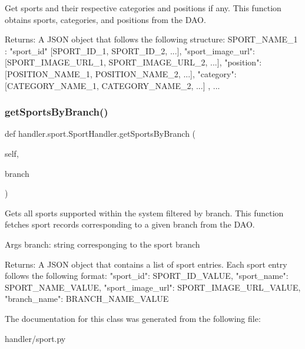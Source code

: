 \begin{DoxyVerb}Get sports and their respective categories and positions if any.
This function obtains sports, categories, and positions from the DAO.

Returns:
    A JSON object that follows the following structure:
{
    SPORT_NAME_1 : 
    {
        "sport_id" [SPORT_ID_1, SPORT_ID_2, ...],
        "sport_image_url": [SPORT_IMAGE_URL_1, SPORT_IMAGE_URL_2, ...],
        "position": [POSITION_NAME_1, POSITION_NAME_2, ...],
        "category": [CATEGORY_NAME_1, CATEGORY_NAME_2, ...]
    },
    ...
}
\end{DoxyVerb}
 \mbox{\label{classhandler_1_1sport_1_1_sport_handler_a5cd67d66c4b722c46da490fe63beff74}} 
\subsubsection{\texorpdfstring{get\+Sports\+By\+Branch()}{getSportsByBranch()}}
{\footnotesize\ttfamily def handler.\+sport.\+Sport\+Handler.\+get\+Sports\+By\+Branch (\begin{DoxyParamCaption}\item[{}]{self,  }\item[{}]{branch }\end{DoxyParamCaption})}

\begin{DoxyVerb}Gets all sports supported within the system filtered by branch.
This function fetches sport records corresponding to a given branch from the DAO.

Args
    branch: string corresponging to the sport branch

Returns:
    A JSON object that contains a list of sport entries.
    Each sport entry follows the following format:
{
    "sport_id": SPORT_ID_VALUE,
    "sport_name": SPORT_NAME_VALUE,
    "sport_image_url": SPORT_IMAGE_URL_VALUE,
    "branch_name": BRANCH_NAME_VALUE
}
\end{DoxyVerb}
 

The documentation for this class was generated from the following file\+:\begin{DoxyCompactItemize}
\item 
handler/sport.\+py\end{DoxyCompactItemize}

